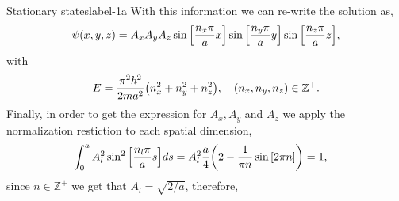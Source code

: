 \documentclass[../main.tex]{subfiles}
\begin{document}
\begin{sol}{Stationary states}{label-1a}
    With this information we can re-write the solution as,
    \begin{gather*}
        \psi\qty(x,y,z)=A_x A_y A_z\sin\qty[\frac{n_x\pi}{a} x]\sin\qty[\frac{n_y\pi}{a} y]\sin\qty[\frac{n_z\pi}{a} z],
    \end{gather*} 
    with
    \begin{gather*}
        E=\frac{\pi^2\hbar^2}{2ma^2}\qty(n_x^2+n_y^2+n_z^2), \quad \qty(n_x,n_y,n_z)\in\mathbb{Z}^+.
    \end{gather*}
    Finally, in order to get the expression for $A_x,A_y$ and $A_z$ we apply the normalization restiction to each spatial dimension,
    \begin{align*}
        \int_0^a A_l^2\sin^2\qty[\frac{n_l\pi}{a} s] ds &= A^2_l\frac{a}{4}\qty(2-\frac{1}{\pi n}\sin\qty[2\pi n]) = 1,
    \end{align*}
    since $n\in\mathbb{Z}^+$ we get that $A_l=\sqrt{2/a}$, therefore,
\end{sol}
\end{document}
